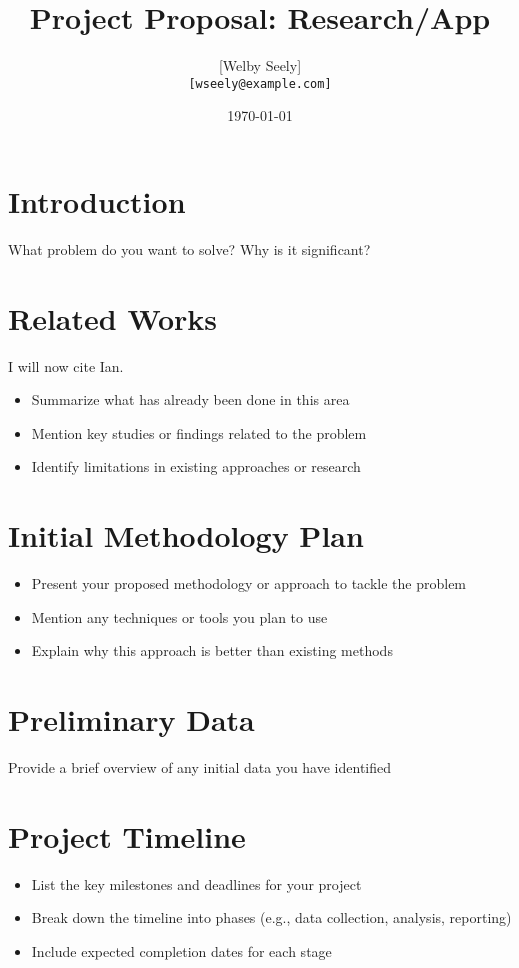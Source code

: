 \documentclass{article}
\title{Project Proposal: Research/App}
\author{
  [Welby Seely] \\
  \texttt{[wseely@example.com]}
}
\date{\today}
\begin{document}
\maketitle



\section*{Introduction}
What problem do you want to solve? Why is it significant?

\section*{Related Works}

I will now cite Ian.~\cite{goodfellow2016deep}

\begin{itemize}
    \item Summarize what has already been done in this area
    \item Mention key studies or findings related to the problem
    \item Identify limitations in existing approaches or research
\end{itemize}

\section*{Initial Methodology Plan}
\begin{itemize}
    \item Present your proposed methodology or approach to tackle the problem
    \item Mention any techniques or tools you plan to use
    \item Explain why this approach is better than existing methods
\end{itemize}


\section*{Preliminary Data}
Provide a brief overview of any initial data you have identified


\section*{Project Timeline}
\begin{itemize}
    \item List the key milestones and deadlines for your project
    \item Break down the timeline into phases (e.g., data collection, analysis, reporting)
    \item Include expected completion dates for each stage
\end{itemize}




\end{document}
